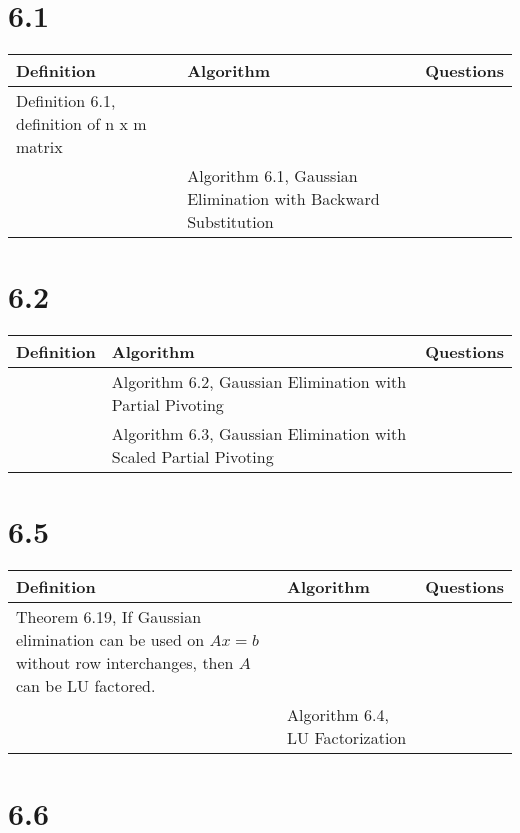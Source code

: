 \documentclass{article}
\begin{document}
\section*{6.1}

\begin{tabularx}{\textwidth}{ |X|X|c| }
    \hline
	{\bf Definition} & {\bf Algorithm} & {\bf Questions} \\
    \hline
	Definition 6.1, definition of n x m matrix & & \\
    \hline
	 & Algorithm 6.1, Gaussian Elimination with Backward Substitution & \\
    \hline
\end{tabularx}

\section*{6.2}

\begin{tabularx}{\textwidth}{ |c|X|c| }
    \hline
	{\bf Definition} & {\bf Algorithm} & {\bf Questions} \\
    \hline
	 & Algorithm 6.2, Gaussian Elimination with Partial Pivoting & \\
    \hline
	 & Algorithm 6.3, Gaussian Elimination with Scaled Partial Pivoting & \\
    \hline
\end{tabularx}

\section*{6.5}

\begin{tabularx}{\textwidth}{ |X|X|c| }
    \hline
	{\bf Definition} & {\bf Algorithm} & {\bf Questions} \\
    \hline
	Theorem 6.19, If Gaussian elimination can be used on $Ax=b$ without row interchanges, then $A$ can be LU factored. & & \\
    \hline
	 & Algorithm 6.4, LU Factorization & \\
    \hline
\end{tabularx}

\section*{6.6}
\end{document}
